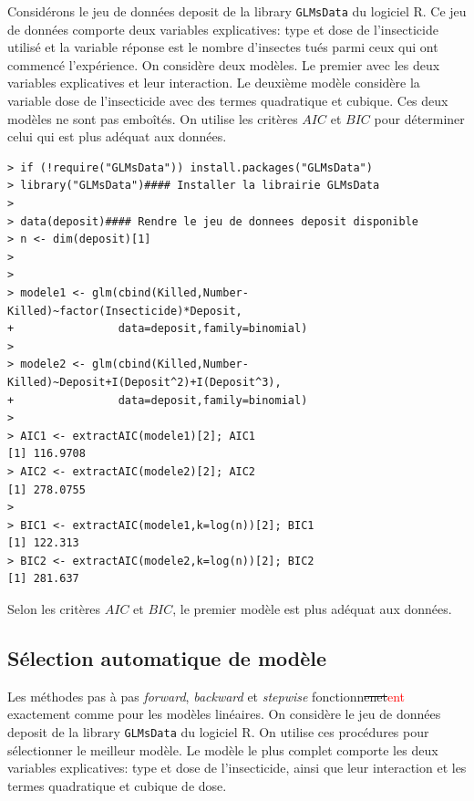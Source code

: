 \documentclass[11pt]{article}
\begin{document}
\noindent Considérons le jeu de données \textsf{deposit} de la library \texttt{GLMsData} du logiciel \textrm{R}. Ce jeu de données comporte deux variables explicatives: type et dose de l'insecticide utilisé et la variable réponse est le nombre d'insectes tués parmi ceux qui ont commencé l'expérience. On considère deux modèles. Le premier avec les deux variables explicatives et leur interaction. Le deuxième modèle considère la variable dose de l'insecticide avec des termes quadratique et cubique. Ces deux modèles ne sont pas embo\^ités. On utilise les critères $AIC$ et $BIC$ pour déterminer celui qui est plus adéquat aux données. 

\begin{verbatim}
> if (!require("GLMsData")) install.packages("GLMsData")
> library("GLMsData")#### Installer la librairie GLMsData
> 
> data(deposit)#### Rendre le jeu de donnees deposit disponible
> n <- dim(deposit)[1]
> 
> 
> modele1 <- glm(cbind(Killed,Number-Killed)~factor(Insecticide)*Deposit,
+                data=deposit,family=binomial)
> 
> modele2 <- glm(cbind(Killed,Number-Killed)~Deposit+I(Deposit^2)+I(Deposit^3),
+                data=deposit,family=binomial)
> 
> AIC1 <- extractAIC(modele1)[2]; AIC1
[1] 116.9708
> AIC2 <- extractAIC(modele2)[2]; AIC2
[1] 278.0755
> 
> BIC1 <- extractAIC(modele1,k=log(n))[2]; BIC1
[1] 122.313
> BIC2 <- extractAIC(modele2,k=log(n))[2]; BIC2
[1] 281.637
\end{verbatim}

\noindent Selon les critères $AIC$ et $BIC$, le premier modèle est plus adéquat aux données.

\subsection{Sélection automatique de modèle}

Les méthodes pas \`a pas {\it forward}, {\it backward} et {\it stepwise} fonctionn\sout{enet}\textcolor{red}{ent} exactement comme pour les modèles linéaires. On considère le jeu de données \textsf{deposit} de la library \texttt{GLMsData} du logiciel \textrm{R}. On utilise ces procédures pour sélectionner le meilleur modèle. Le modèle le plus complet comporte les deux variables explicatives: type et dose de l'insecticide, ainsi que leur interaction et les termes quadratique et cubique de dose.
\end{document}
